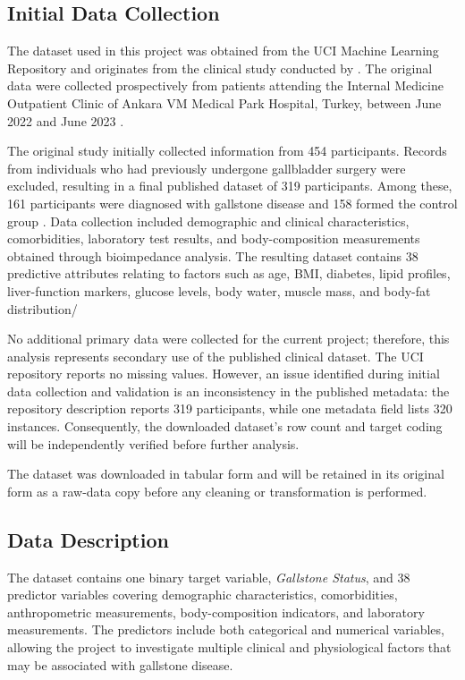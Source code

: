 \subsection{Initial Data Collection}
\label{subsec:initial-data-collection}

The dataset used in this project was obtained from the UCI Machine Learning Repository and originates from the clinical study conducted by \textcite{esen2024early}. The original data were collected prospectively from patients attending the Internal Medicine Outpatient Clinic of Ankara VM Medical Park Hospital, Turkey, between June 2022 and June 2023 \parencite{esen2024early,uci2025gallstone}.

The original study initially collected information from 454 participants. Records from individuals who had previously undergone gallbladder surgery were excluded, resulting in a final published dataset of 319 participants. Among these, 161 participants were diagnosed with gallstone disease and 158 formed the control group \parencite{esen2024early}. Data collection included demographic and clinical characteristics, comorbidities, laboratory test results, and body-composition measurements obtained through bioimpedance analysis. The resulting dataset contains 38 predictive attributes relating to factors such as age, BMI, diabetes, lipid profiles, liver-function markers, glucose levels, body water, muscle mass, and body-fat distribution/

No additional primary data were collected for the current project; therefore, this analysis represents secondary use of the published clinical dataset. The UCI repository reports no missing values. However, an issue identified during initial data collection and validation is an inconsistency in the published metadata: the repository description reports 319 participants, while one metadata field lists 320 instances. Consequently, the downloaded dataset's row count and target coding will be independently verified before further analysis.

The dataset was downloaded in tabular form and will be retained in its original form as a raw-data copy before any cleaning or transformation is performed.

\subsection{Data Description}
\label{subsec:data-description}

The dataset contains one binary target variable, \textit{Gallstone Status}, and 38 predictor variables covering demographic characteristics, comorbidities, anthropometric measurements, body-composition indicators, and laboratory measurements. The predictors include both categorical and numerical variables, allowing the project to investigate multiple clinical and physiological factors that may be associated with gallstone disease.

